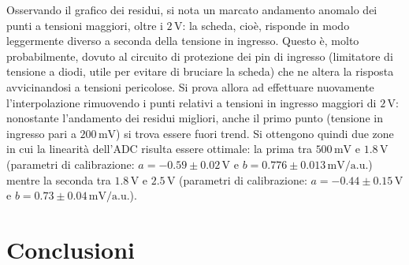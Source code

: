 \documentclass[a4paper,11pt]{article} %
\begin{document}

\noindent Osservando il grafico dei residui, si nota un marcato andamento anomalo dei punti a tensioni maggiori, oltre i
$2\,\si{\volt}$: la scheda, cioè, risponde in modo leggermente diverso a seconda della tensione in ingresso. Questo è,
molto probabilmente, dovuto al circuito di protezione dei pin di ingresso (limitatore di tensione a diodi, utile per
evitare di bruciare la scheda) che ne altera la risposta avvicinandosi a tensioni pericolose. Si prova allora ad
effettuare nuovamente l'interpolazione rimuovendo i punti relativi a tensioni in ingresso maggiori di $2\,\si{\volt}$:
nonostante l'andamento dei residui migliori, anche il primo punto (tensione in ingresso pari a $200\,\si{\mV}$) si trova
essere fuori trend. Si ottengono quindi due zone in cui la linearità dell'ADC risulta essere ottimale: la prima tra
$500\,\si{\mV}$ e $1.8\,\si{\volt}$ (parametri di calibrazione: $a = -0.59 \pm 0.02 \, \si{\V}$ e $b = 0.776 \pm 0.013
\,\si{\mV}/\text{a.u.}$) mentre la seconda tra $1.8\,\si{\volt}$ e $2.5\,\si{\volt}$ (parametri di calibrazione: $a =
-0.44 \pm 0.15 \, \si{\V}$ e $b = 0.73 \pm 0.04 \,\si{\mV}/\text{a.u.}$).




\section{Conclusioni}
\end{document}

